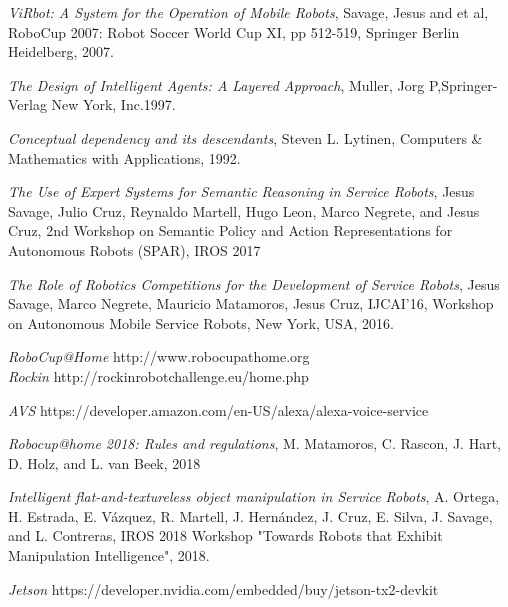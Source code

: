 \documentclass{llncs}
\begin{document}
\begin{thebibliography}{1}

{\em ViRbot: A System for the Operation of Mobile Robots}, Savage, Jesus and et al, RoboCup 2007: Robot Soccer World Cup XI,
pp 512-519, Springer Berlin Heidelberg, 2007.

{\em The Design of Intelligent Agents: A Layered Approach}, Muller, Jorg P,Springer-Verlag New York, Inc.1997.

{\em Conceptual dependency and its descendants}, Steven L. Lytinen, Computers \& Mathematics with Applications, 1992.

\textit{The Use of Expert Systems for Semantic Reasoning in Service Robots}, Jesus Savage, Julio Cruz, Reynaldo Martell, Hugo Leon, Marco Negrete, and Jesus Cruz, 2nd Workshop on Semantic Policy and Action Representations for Autonomous Robots (SPAR), IROS 2017

{\em The Role of Robotics Competitions for the Development of Service Robots}, 
 Jesus Savage, Marco Negrete, Mauricio Matamoros, Jesus Cruz,
IJCAI'16, Workshop on Autonomous Mobile Service Robots, New York, USA, 2016.

{\em RoboCup@Home} http://www.robocupathome.org
\\
{\em Rockin} http://rockinrobotchallenge.eu/home.php

 {\em AVS} https://developer.amazon.com/en-US/alexa/alexa-voice-service



\textit{Robocup@home 2018: Rules and regulations}, M. Matamoros, C. Rascon, J. Hart, D. Holz, and L. van Beek, 2018

\textit{Intelligent flat-and-textureless object manipulation in Service Robots}, A. Ortega, H. Estrada, E. Vázquez, R. Martell, J. Hernández, J. Cruz, E. Silva, J. Savage, and L. Contreras, IROS 2018 Workshop "Towards Robots that Exhibit Manipulation Intelligence", 2018.

{\em Jetson} https://developer.nvidia.com/embedded/buy/jetson-tx2-devkit

\end{thebibliography}
\end{document}
